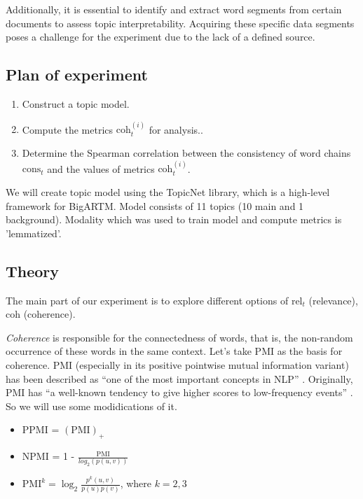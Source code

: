 \documentclass{article}
\begin{document}
Additionally, it is essential to identify and extract word segments from certain documents to assess topic interpretability. 
Acquiring these specific data segments poses a challenge for the experiment due to the lack of a defined source.

\subsection{Plan of experiment}

\begin{enumerate}
    \item Construct a topic model.
    \item Compute the metrics $\text{coh}^{(i)}_t$  for analysis..
    \item Determine the Spearman correlation between the consistency of word chains  $\text{cons}_t$ and the values of metrics $\text{coh}^{(i)}_t$.
\end{enumerate}

We will create topic model using the TopicNet library, which is a high-level framework for BigARTM.
Model consists of 11 topics (10 main and 1 background). Modality which was used to train model and compute metrics is 'lemmatized'.

\subsection{Theory}

The main part of our experiment is to explore different options of $\text{rel}_t$ (relevance), $\text{coh}$ (coherence). 

\textit{Coherence} is responsible for the connectedness of words, that is, the non-random occurrence of these words in the same context.
Let's take  PMI \cite{newman-etal-2010-automatic} as the basis for coherence. PMI (especially in its positive pointwise mutual information variant) has been described as ``one of the most important concepts in NLP'' \cite{jurafskyspeech}. Originally, PMI has ``a well-known tendency to give higher scores to low-frequency events'' \cite{role2011handling}. So we will use some modidications of it.

\begin{itemize}
     \item PPMI = $(\text{PMI})_+$
     \item NPMI = 1 - $\frac{\text{PMI}} {log_2(p(u, v))}$
     \item $\text{PMI}^k = \log_2 \frac {p^k(u, v)} {p(u) p(v)}$, where $k=2, 3$
     
 \end{itemize}
\end{document}

